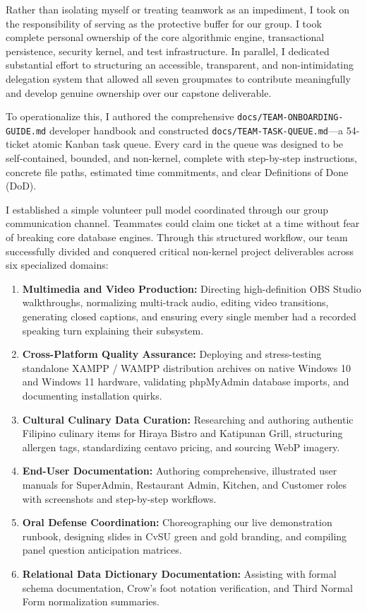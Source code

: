 Rather than isolating myself or treating teamwork as an impediment, I took on the responsibility of serving as the protective buffer for our group. I took complete personal ownership of the core algorithmic engine, transactional persistence, security kernel, and test infrastructure. In parallel, I dedicated substantial effort to structuring an accessible, transparent, and non-intimidating delegation system that allowed all seven groupmates to contribute meaningfully and develop genuine ownership over our capstone deliverable.

To operationalize this, I authored the comprehensive \texttt{docs/TEAM-ONBOARDING-GUIDE.md} developer handbook and constructed \texttt{docs/TEAM-TASK-QUEUE.md}---a 54-ticket atomic Kanban task queue. Every card in the queue was designed to be self-contained, bounded, and non-kernel, complete with step-by-step instructions, concrete file paths, estimated time commitments, and clear Definitions of Done (DoD).

I established a simple volunteer pull model coordinated through our group communication channel. Teammates could claim one ticket at a time without fear of breaking core database engines. Through this structured workflow, our team successfully divided and conquered critical non-kernel project deliverables across six specialized domains:
\begin{enumerate}
    \item \textbf{Multimedia and Video Production:} Directing high-definition OBS Studio walkthroughs, normalizing multi-track audio, editing video transitions, generating closed captions, and ensuring every single member had a recorded speaking turn explaining their subsystem.
    \item \textbf{Cross-Platform Quality Assurance:} Deploying and stress-testing standalone XAMPP / WAMPP distribution archives on native Windows 10 and Windows 11 hardware, validating phpMyAdmin database imports, and documenting installation quirks.
    \item \textbf{Cultural Culinary Data Curation:} Researching and authoring authentic Filipino culinary items for Hiraya Bistro and Katipunan Grill, structuring allergen tags, standardizing centavo pricing, and sourcing WebP imagery.
    \item \textbf{End-User Documentation:} Authoring comprehensive, illustrated user manuals for SuperAdmin, Restaurant Admin, Kitchen, and Customer roles with screenshots and step-by-step workflows.
    \item \textbf{Oral Defense Coordination:} Choreographing our live demonstration runbook, designing slides in CvSU green and gold branding, and compiling panel question anticipation matrices.
    \item \textbf{Relational Data Dictionary Documentation:} Assisting with formal schema documentation, Crow's foot notation verification, and Third Normal Form normalization summaries.
\end{enumerate}

